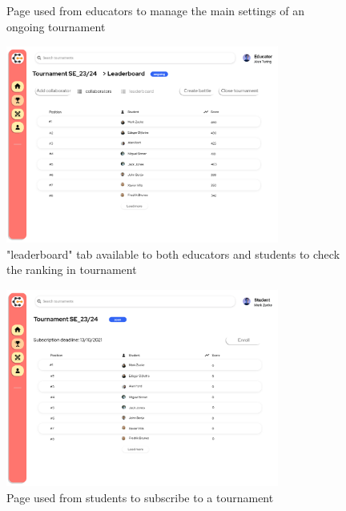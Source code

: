 \begin{enumerate}[label=\textbf{F\arabic*)}]
\begin{figure}[H]
        \caption{Page used from educators to manage the main settings of an ongoing tournament}
    \end{figure}
    \begin{figure}[H]
        \centering
        \includegraphics[width=0.8\textwidth]{Mockups/8_educator_tournament_leaderboard.png}
        \caption{"leaderboard" tab available to both educators and students to check the ranking in tournament}
    \end{figure}

    \begin{figure}[H]
        \centering
        \includegraphics[width=0.8\textwidth]{Mockups/9_student_tournament_subscription.png}
        \caption{Page used from students to subscribe to a tournament}
    \end{figure}


\end{enumerate}

